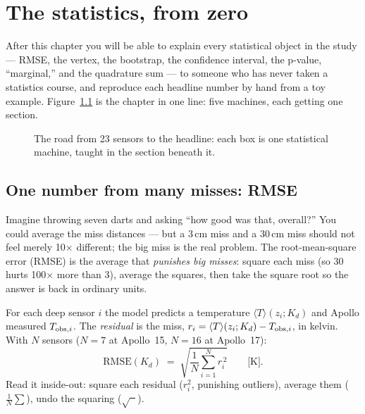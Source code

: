 \documentclass[11pt]{report}
\newcommand{\Tm}{\langle T\rangle}
\begin{document}
\chapter{The statistics, from zero}\label{ch:statszero}

After this chapter you will be able to explain every statistical object in the
study --- RMSE, the vertex, the bootstrap, the confidence interval, the
p-value, ``marginal,'' and the quadrature sum --- to someone who has never
taken a statistics course, and reproduce each headline number by hand from a
toy example. Figure~\ref{fig:statsflow} is the chapter in one line: five
machines, each getting one section.

\begin{figure}[htbp]\centering

\caption{The road from 23 sensors to the headline: each box is one
statistical machine, taught in the section beneath it.}
\label{fig:statsflow}
\end{figure}

\section{One number from many misses: RMSE}\label{sec:rmsezero}

\begin{plain}
Imagine throwing seven darts and asking ``how good was that, overall?'' You
could average the miss distances --- but a 3\,cm miss and a 30\,cm miss should
not feel merely 10$\times$ different; the big miss is the real problem. The
root-mean-square error (RMSE) is the average that \emph{punishes big misses}:
square each miss (so 30 hurts 100$\times$ more than 3), average the squares,
then take the square root so the answer is back in ordinary units.
\end{plain}

For each deep sensor $i$ the model predicts a temperature
$\Tm(z_i; K_d)$ and Apollo measured $T_{{\rm obs},i}$. The \emph{residual} is
the miss, $r_i = \Tm(z_i;K_d) - T_{{\rm obs},i}$, in kelvin. With $N$ sensors
($N{=}7$ at Apollo~15, $N{=}16$ at Apollo~17):
\[
\mathrm{RMSE}(K_d) \;=\; \sqrt{\frac{1}{N}\sum_{i=1}^{N} r_i^{\,2}}
\qquad\text{[K].}
\]
Read it inside-out: square each residual ($r_i^2$, punishing outliers), average
them ($\frac{1}{N}\sum$), undo the squaring ($\sqrt{\phantom{x}}$).
\end{document}

